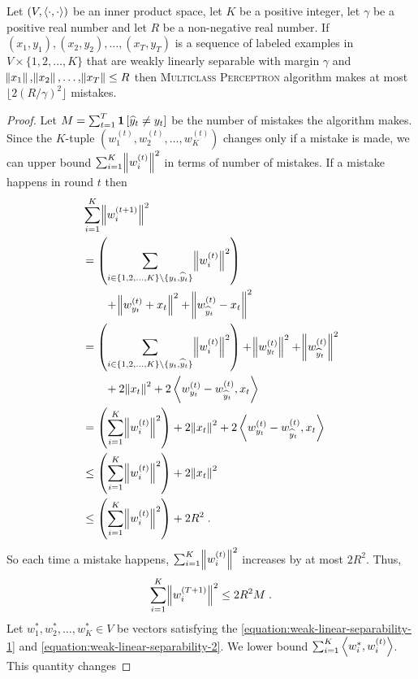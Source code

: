 \begin{theorem}
\label{theorem:mutliclass-perceptron-mistake-upper-bound}
Let $(V, \left\langle \cdot, \cdot \right\rangle)$ be an inner product space, let $K$ be a positive
integer, let $\gamma$ be a positive real number and let $R$ be a non-negative real
number. If $(x_1, y_1), (x_2, y_2), \dots, (x_T, y_T)$ is a sequence of labeled
examples in $V \times \{1,2,\dots,K\}$ that are weakly linearly separable with margin
$\gamma$ and $\norm{x_1}, \norm{x_2}, \dots, \norm{x_T} \le R$
then \textsc{Multiclass Perceptron} algorithm makes at most $\lfloor
2(R/\gamma)^2 \rfloor$ mistakes.
\end{theorem}

\begin{proof}
Let $M = \sum_{t=1}^T \mathbf{1}\left[\widehat y_t \neq y_t \right]$ be the number of
mistakes the algorithm makes. Since the $K$-tuple $(w_1^{(t)}, w_2^{(t)}, \dots,
w_K^{(t)})$ changes only if a mistake is made, we can upper bound $\sum_{i=1}^K
\norm{w_i^{(t)}}^2$ in terms of number of mistakes.
If a mistake happens in round $t$ then
\begin{align*}
& \sum_{i=1}^K \norm{w_i^{(t+1)}}^2 \\
& = \left(\sum_{i \in \{1,2,\dots,K\} \setminus \{y_t, \widehat y_t\} } \norm{w_i^{(t)}}^2 \right) \\
& \qquad + \norm{w_{y_t}^{(t)} + x_t}^2 + \norm{w_{\widehat y_t}^{(t)} - x_t}^2 \\
& = \left(\sum_{i \in \{1,2,\dots,K\} \setminus \{y_t, \widehat y_t\} } \norm{w_i^{(t)}}^2 \right) + \norm{w_{y_t}^{(t)}}^2 + \norm{w_{\widehat y_t}^{(t)}}^2 \\
& \qquad + 2 \norm{x_t}^2 + 2 \left\langle w_{y_t}^{(t)} - w_{\widehat y_t}^{(t)}, x_t \right\rangle \\
& = \left(\sum_{i=1}^K \norm{w_i^{(t)}}^2 \right) + 2 \norm{x_t}^2 + 2 \left\langle w_{y_t}^{(t)} - w_{\widehat y_t}^{(t)}, x_t \right\rangle \\
& \le \left(\sum_{i=1}^K \norm{w_i^{(t)}}^2 \right) + 2 \norm{x_t}^2 \\
& \le \left(\sum_{i=1}^K \norm{w_i^{(t)}}^2 \right) + 2 R^2 \; .
\end{align*}
So each time a mistake happens, $\sum_{i=1}^K \norm{w_i^{(t)}}^2$ increases by at most $2R^2$. Thus,
$$
\sum_{i=1}^K \norm{w_i^{(T+1)}}^2 \le 2R^2 M \; .
$$
Let $w_1^*, w_2^*, \dots, w_K^* \in V$ be vectors satisfying the
\eqref{equation:weak-linear-separability-1} and
\eqref{equation:weak-linear-separability-2}. We lower bound $\sum_{i=1}^K \left\langle w_i^*, w_i^{(t)} \right\rangle$. This quantity changes

\end{proof}
